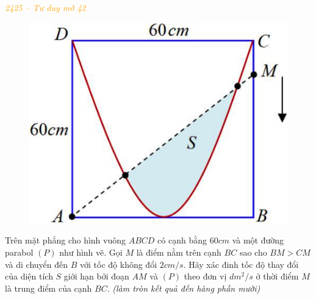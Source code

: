 \documentclass[twoside,final]{hcmut-report}
\newcommand{\exercise}[1]{\begin{exercisebox}#1\end{exercisebox}}
\begin{document}
\exercise{
    \textcolor{orange}{\textit{2425 -- Tư duy mở 42}}

    \begin{figure}
        \centering
        \includegraphics*[width=1.05\linewidth]{images/Ứng dụng tích phân/TDM42.png}
    \end{figure}
    Trên mặt phẳng cho hình vuông $ABCD$ có cạnh bằng $60cm$ và một đường parabol $(P)$ như hình vẽ. Gọi $M$ là điểm nằm trên cạnh $BC$ sao cho $BM > CM$ và di chuyển đến $B$ với tốc độ không đổi $2cm/s$. Hãy xác đinh tốc độ thay đổi của diện tích $S$ giới hạn bởi đoạn $AM$ và $(P)$ theo đơn vị $dm^2/s$ ở thời điểm $M$ là trung điểm của cạnh $BC$. \textit{(làm tròn kết quả đến hàng phần mười)}}
\end{document}
